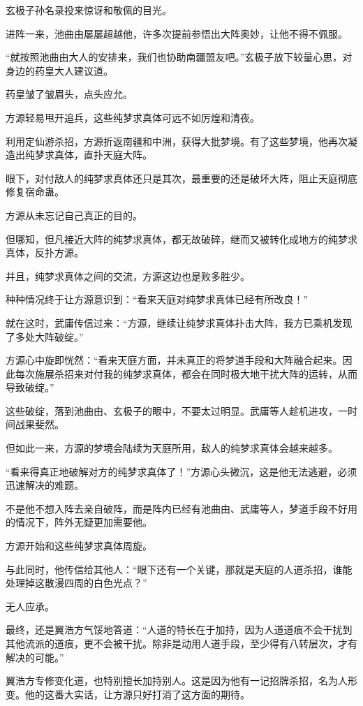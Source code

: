 \begin{this_body}
玄极子孙名录投来惊讶和敬佩的目光。

进阵一来，池曲由屡屡超越他，许多次提前参悟出大阵奥妙，让他不得不佩服。

“就按照池曲由大人的安排来，我们也协助南疆盟友吧。”玄极子放下较量心思，对身边的药皇大人建议道。

药皇皱了皱眉头，点头应允。

方源轻易甩开追兵，这些纯梦求真体可远不如厉煌和清夜。

利用定仙游杀招，方源折返南疆和中洲，获得大批梦境。有了这些梦境，他再次凝造出纯梦求真体，直扑天庭大阵。

眼下，对付敌人的纯梦求真体还只是其次，最重要的还是破坏大阵，阻止天庭彻底修复宿命蛊。

方源从未忘记自己真正的目的。

但哪知，但凡接近大阵的纯梦求真体，都无故破碎，继而又被转化成地方的纯梦求真体，反扑方源。

并且，纯梦求真体之间的交流，方源这边也是败多胜少。

种种情况终于让方源意识到：“看来天庭对纯梦求真体已经有所改良！”

就在这时，武庸传信过来：“方源，继续让纯梦求真体扑击大阵，我方已乘机发现了多处大阵破绽。”

方源心中旋即恍然：“看来天庭方面，并未真正的将梦道手段和大阵融合起来。因此每次施展杀招来对付我的纯梦求真体，都会在同时极大地干扰大阵的运转，从而导致破绽。”

这些破绽，落到池曲由、玄极子的眼中，不要太过明显。武庸等人趁机进攻，一时间战果斐然。

但如此一来，方源的梦境会陆续为天庭所用，敌人的纯梦求真体会越来越多。

“看来得真正地破解对方的纯梦求真体了！”方源心头微沉，这是他无法逃避，必须迅速解决的难题。

不是他不想入阵去亲自破阵，而是阵内已经有池曲由、武庸等人，梦道手段不好用的情况下，阵外无疑更加需要他。

方源开始和这些纯梦求真体周旋。

与此同时，他传信给其他人：“眼下还有一个关键，那就是天庭的人道杀招，谁能处理掉这散漫四周的白色光点？”

无人应承。

最终，还是翼浩方气馁地答道：“人道的特长在于加持，因为人道道痕不会干扰到其他流派的道痕，更不会被干扰。除非是动用人道手段，至少得有八转层次，才有解决的可能。”

翼浩方专修变化道，也特别擅长加持别人。这是因为他有一记招牌杀招，名为人形变。他的这番大实话，让方源只好打消了这方面的期待。


\end{this_body}
